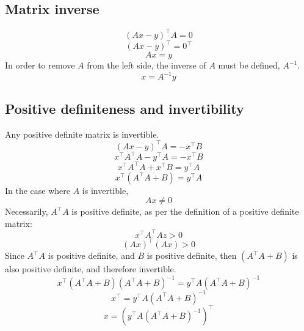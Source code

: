 \documentclass[9pt,twocolumn]{article}
\begin{document}
\subsection*{Matrix inverse}
\begin{equation*}
	(Ax-y)^{\top}A=0
\end{equation*}
\begin{equation*}
	(Ax-y)^{\top}=0^{\top}
\end{equation*}
\begin{equation*}
	Ax = y
\end{equation*}
In order to remove $A$ from the left side, the inverse of $A$ must be defined, $A^{-1}$.
\begin{equation*}
	x = A^{-1}y
\end{equation*}

\subsection*{Positive definiteness and invertibility}
Any positive definite matrix is invertible.
\begin{equation*}
	(Ax-y)^{\top}A = -x^{\top}B
\end{equation*}
\begin{equation*}
	x^{\top}A^{\top}A-y^{\top}A = -x^{\top}B
\end{equation*}
\begin{equation*}
	x^{\top}A^{\top}A + x^{\top}B = y^{\top}A
\end{equation*}
\begin{equation*}
	x^{\top}(A^{\top}A+B) = y^{\top}A
\end{equation*}
In the case where $A$ is invertible,
\begin{equation*}
	Ax \neq 0
\end{equation*}
Necessarily, $A^{\top}A$ is positive definite, as per the definition of a positive definite matrix:
\begin{equation*}
	x^{\top}A^{\top}Az > 0
\end{equation*}
\begin{equation*}
	(Ax)^{\top}(Ax)>0
\end{equation*}
Since $A^{\top}A$ is positive definite, and $B$ is positive definite, then $(A^{\top}A+B)$ is also positive definite, and therefore invertible.
\begin{equation*}
	x^{\top}(A^{\top}A+B)(A^{\top}A+B)^{-1} = y^{\top}A(A^{\top}A+B)^{-1}
\end{equation*}
\begin{equation*}
	x^{\top} = y^{\top}A(A^{\top}A+B)^{-1}
\end{equation*}
\begin{equation*}
	x = (y^{\top}A(A^{\top}A+B)^{-1})^{\top}
\end{equation*}
\end{document}
